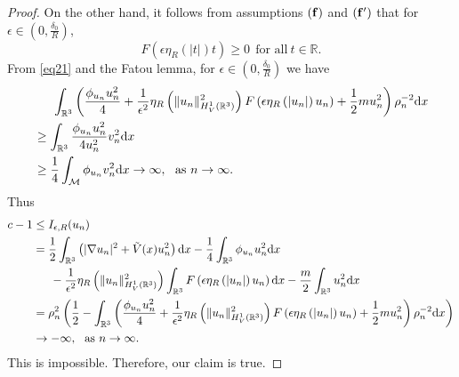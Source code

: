 \documentclass[12pt]{amsart}
\numberwithin{equation}{section}
\theoremstyle{definition}
\begin{document}
\begin{proof}
On the other hand, it follows from assumptions $({\bf f})$ and $({\bf f'})$ that for $\epsilon\in (0,\frac{\delta_0}{R})$,
\begin{equation}\label{eq21}
   F\left (\epsilon \eta _{R} \left ( \left | t\right |\right )t\right )\geq 0\ ~\text{for all}~t\in\mathbb{R}.
\end{equation}
From \eqref{eq21} and the Fatou lemma, for $\epsilon\in (0,\frac{\delta_0}{R})$ we have
\begin{equation*}
	\begin{split}
&\indent\int_{\mathbb{R}^3}\left(\frac{\phi_{u_n}u^{2}_{n}}{4}+\frac{1}{\epsilon^2}\eta _{R}\left (\|u_n\|^{2}_{H^1_{V}(\mathbb{R}^3)}\right )F\left (\epsilon \eta _{R} \left ( \left | u_n\right |\right )u_n\right )+\frac{1}{2}mu_{n}^{2}\right)\rho^{-2}_n\text{d}x\\
&\geq\int_{\mathbb{R}^3}\frac{\phi_{u_n}u^{2}_{n}}{4u_{n}^{2}}v^{2}_{n}\text{d}x\\
&\geq \frac{1}{4}\int_{\mathcal{M}}\phi_{u_n}v^{2}_n\text{d}x\to\infty,~~\text{as}~n\to\infty.
\end{split}
\end{equation*}
Thus
\begin{equation*}
		\begin{split}
		c-1&\leq I_{\epsilon,R}(u_n)\\
		&=\frac{1}{2}\int_{\mathbb{R}^3}\left(|\nabla u_n|^{2}+\tilde V(x)u_n^{2}\right)\text{d}x-\frac{1}{4}\int_{\mathbb{R}^3}\phi_{u_n}u_n^{2}\text{d}x\\
		&\indent-\frac{1}{\epsilon^{2}}\eta _{R}\left (\|u_n\|^{2}_{H^1_{V}(\mathbb{R}^3)}\right )\int_{\mathbb{R}^3}F\left (\epsilon \eta _{R} \left ( \left | u_n\right |\right )u_n\right )\text{d}x-\frac{m}{2}\int_{\mathbb{R}^3}u_n^{2}\text{d}x\\
		&=\rho_{n}^{2}\left(\frac{1}{2}-\int_{\mathbb{R}^3}\left(\frac{\phi_{u_n}u^{2}_{n}}{4}+\frac{1}{\epsilon^2}\eta _{R}\left (\|u_n\|^{2}_{H^1_{V}(\mathbb{R}^3)}\right )F\left (\epsilon \eta _{R} \left ( \left | u_n\right |\right )u_n\right )+\frac{1}{2}mu_{n}^{2}\right)\rho^{-2}_n\text{d}x\right)\\
        &\to-\infty,~~\text{as}~n\to\infty.
	\end{split}
    \end{equation*}
This is impossible. Therefore, our claim is true.


\end{proof}
\end{document}
